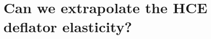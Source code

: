 \documentclass[12pt,a4paper]{paper}
\begin{document}
%
%
%
%
%

\section{Can we extrapolate the HCE deflator elasticity?}
\label{sec:extrapo}
\end{document}
